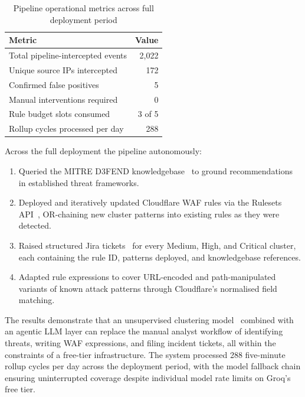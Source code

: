 \documentclass[12pt, a4paper]{report}   %
\begin{document}
\begin{table}[H]
\centering
\caption{Pipeline operational metrics across full deployment
period}
\label{tab:autonomy}
\begin{tabular}{lr}
\hline
\textbf{Metric} & \textbf{Value} \\
\hline
Total pipeline-intercepted events   & 2,022 \\
Unique source IPs intercepted       &   172 \\
Confirmed false positives           &     5 \\
Manual interventions required       &     0 \\
Rule budget slots consumed          & 3 of 5 \\
Rollup cycles processed per day     &   288 \\
\hline
\end{tabular}
\end{table}

Across the full deployment the pipeline autonomously:

\begin{enumerate}
  \item Queried the MITRE D3FEND knowledgebase~\cite{d3fend}
        to ground recommendations in established threat
        frameworks.
  \item Deployed and iteratively updated Cloudflare WAF rules
        via the Rulesets API~\cite{cf-api-lockdown},
        OR-chaining new cluster patterns into existing rules
        as they were detected.
  \item Raised structured Jira tickets~\cite{jira-api} for
        every Medium, High, and Critical cluster, each
        containing the rule ID, patterns deployed, and
        knowledgebase references.
  \item Adapted rule expressions to cover URL-encoded and
        path-manipulated variants of known attack patterns
        through Cloudflare's normalised field matching.
\end{enumerate}

The results demonstrate that an unsupervised clustering
model~\cite{sklearn-hdbscan} combined with an agentic LLM
layer can replace the manual analyst workflow of identifying
threats, writing WAF expressions, and filing incident tickets,
all within the constraints of a free-tier infrastructure. The
system processed 288 five-minute rollup cycles per day across
the deployment period, with the model fallback chain ensuring
uninterrupted coverage despite individual model rate limits on
Groq's free tier.
\end{document}
